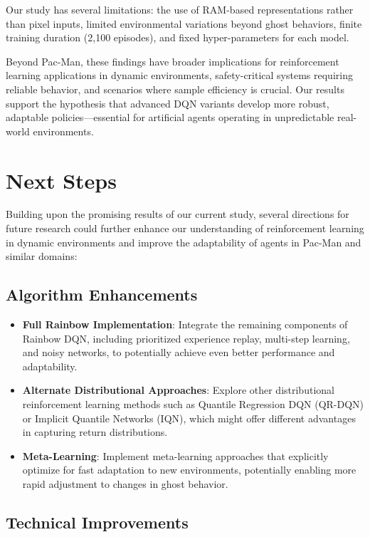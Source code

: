 \documentclass{article} %
\begin{document}
Our study has several limitations: the use of RAM-based representations rather than pixel inputs, limited environmental variations beyond ghost behaviors, finite training duration (2,100 episodes), and fixed hyper-parameters for each model.

Beyond Pac-Man, these findings have broader implications for reinforcement learning applications in dynamic environments, safety-critical systems requiring reliable behavior, and scenarios where sample efficiency is crucial. Our results support the hypothesis that advanced DQN variants develop more robust, adaptable policies—essential for artificial agents operating in unpredictable real-world environments.

\section{Next Steps}

Building upon the promising results of our current study, several directions for future research could further enhance our understanding of reinforcement learning in dynamic environments and improve the adaptability of agents in Pac-Man and similar domains:

\subsection{Algorithm Enhancements}

\begin{itemize}
  \item \textbf{Full Rainbow Implementation}: Integrate the remaining components of Rainbow DQN, including prioritized experience replay, multi-step learning, and noisy networks, to potentially achieve even better performance and adaptability.

  \item \textbf{Alternate Distributional Approaches}: Explore other distributional reinforcement learning methods such as Quantile Regression DQN (QR-DQN) or Implicit Quantile Networks (IQN), which might offer different advantages in capturing return distributions.

  \item \textbf{Meta-Learning}: Implement meta-learning approaches that explicitly optimize for fast adaptation to new environments, potentially enabling more rapid adjustment to changes in ghost behavior.
\end{itemize}

\subsection{Technical Improvements}
\end{document}

